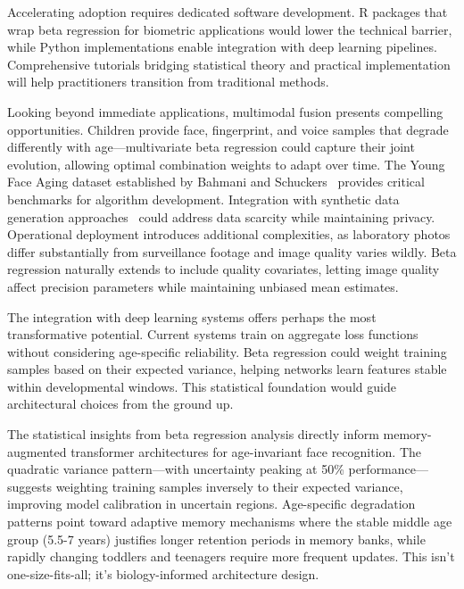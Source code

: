 \documentclass[10pt,journal,compsoc]{IEEEtran}
\begin{document}
Accelerating adoption requires dedicated software development. R packages that wrap beta regression for biometric applications would lower the technical barrier, while Python implementations enable integration with deep learning pipelines. Comprehensive tutorials bridging statistical theory and practical implementation will help practitioners transition from traditional methods.

Looking beyond immediate applications, multimodal fusion presents compelling opportunities. Children provide face, fingerprint, and voice samples that degrade differently with age---multivariate beta regression could capture their joint evolution, allowing optimal combination weights to adapt over time. The Young Face Aging dataset established by Bahmani and Schuckers~\cite{bahmani2022} provides critical benchmarks for algorithm development. Integration with synthetic data generation approaches~\cite{falkenberg2024} could address data scarcity while maintaining privacy. Operational deployment introduces additional complexities, as laboratory photos differ substantially from surveillance footage and image quality varies wildly. Beta regression naturally extends to include quality covariates, letting image quality affect precision parameters while maintaining unbiased mean estimates.

The integration with deep learning systems offers perhaps the most transformative potential. Current systems train on aggregate loss functions without considering age-specific reliability. Beta regression could weight training samples based on their expected variance, helping networks learn features stable within developmental windows. This statistical foundation would guide architectural choices from the ground up.

The statistical insights from beta regression analysis directly inform memory-augmented transformer architectures for age-invariant face recognition. The quadratic variance pattern---with uncertainty peaking at 50\% performance---suggests weighting training samples inversely to their expected variance, improving model calibration in uncertain regions. Age-specific degradation patterns point toward adaptive memory mechanisms where the stable middle age group (5.5-7 years) justifies longer retention periods in memory banks, while rapidly changing toddlers and teenagers require more frequent updates. This isn't one-size-fits-all; it's biology-informed architecture design.
\end{document}
